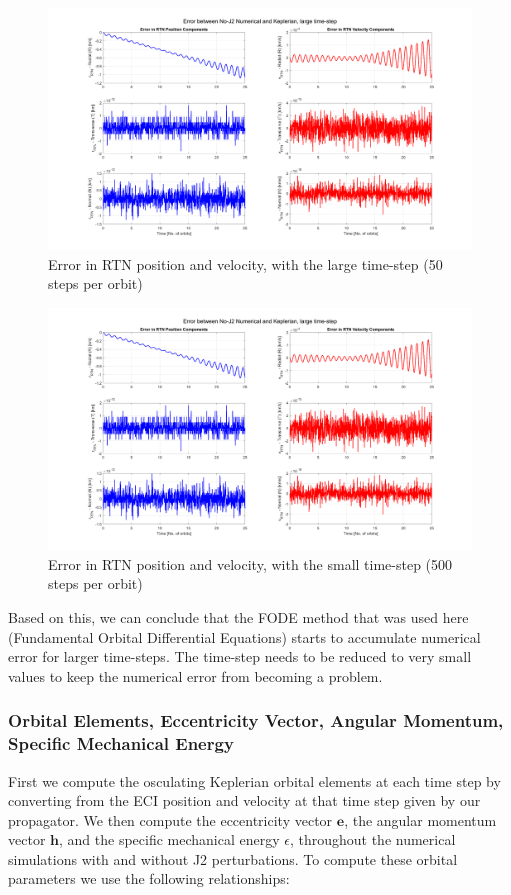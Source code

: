 \begin{figure}[H]
    \centering
    \includegraphics[width=0.75\linewidth]{sim/figures/comparing_rtn_large_timestep.png}
    \caption{Error in RTN position and velocity, with the large time-step (50 steps per orbit)}
    \label{fig:rtn_compare_large_timestep}
\end{figure}

\begin{figure}[H]
    \centering
    \includegraphics[width=0.75\linewidth]{sim/figures/comparing_rtn_large_timestep.png}
    \caption{Error in RTN position and velocity, with the small time-step (500 steps per orbit)}
    \label{fig:rtn_compare_small_timestep}
\end{figure}

Based on this, we can conclude that the FODE method that was used here (Fundamental Orbital Differential Equations) starts to accumulate numerical error for larger time-steps. The time-step needs to be reduced to very small values to keep the numerical error from becoming a problem.

\subsubsection{Orbital Elements, Eccentricity Vector, Angular Momentum, Specific Mechanical Energy} \label{sec:oe_compares}

First we compute the osculating Keplerian orbital elements at each time step by converting from the ECI position and velocity at that time step given by our propagator. We then compute the eccentricity vector $\boldsymbol{e}$, the angular momentum vector $\boldsymbol{h}$, and the specific mechanical energy $\epsilon$, throughout the numerical simulations with and without J2 perturbations. To compute these orbital parameters we use the following relationships:

